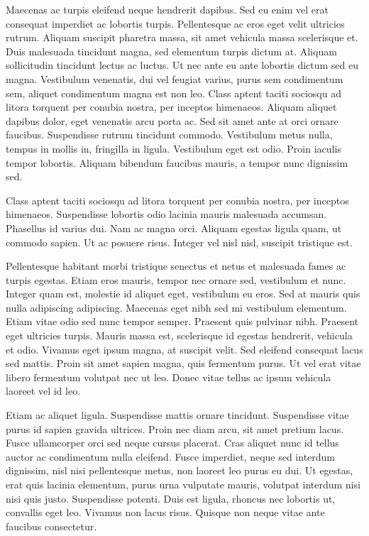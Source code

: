 \documentclass[a4paper]{article}
\begin{document}
Maecenas ac turpis eleifend neque hendrerit dapibus. Sed eu enim vel erat consequat imperdiet ac lobortis turpis. Pellentesque ac eros eget velit ultricies rutrum. Aliquam suscipit pharetra massa, sit amet vehicula massa scelerisque et. Duis malesuada tincidunt magna, sed elementum turpis dictum at. Aliquam sollicitudin tincidunt lectus ac luctus. Ut nec ante eu ante lobortis dictum sed eu magna. Vestibulum venenatis, dui vel feugiat varius, purus sem condimentum sem, aliquet condimentum magna est non leo. Class aptent taciti sociosqu ad litora torquent per conubia nostra, per inceptos himenaeos. Aliquam aliquet dapibus dolor, eget venenatis arcu porta ac. Sed sit amet ante at orci ornare faucibus. Suspendisse rutrum tincidunt commodo. Vestibulum metus nulla, tempus in mollis in, fringilla in ligula. Vestibulum eget est odio. Proin iaculis tempor lobortis. Aliquam bibendum faucibus mauris, a tempor nunc dignissim sed.

Class aptent taciti sociosqu ad litora torquent per conubia nostra, per inceptos himenaeos. Suspendisse lobortis odio lacinia mauris malesuada accumsan. Phasellus id varius dui. Nam ac magna orci. Aliquam egestas ligula quam, ut commodo sapien. Ut ac posuere risus. Integer vel nisl nisl, suscipit tristique est.

Pellentesque habitant morbi tristique senectus et netus et malesuada fames ac turpis egestas. Etiam eros mauris, tempor nec ornare sed, vestibulum et nunc. Integer quam est, molestie id aliquet eget, vestibulum eu eros. Sed at mauris quis nulla adipiscing adipiscing. Maecenas eget nibh sed mi vestibulum elementum. Etiam vitae odio sed nunc tempor semper. Praesent quis pulvinar nibh. Praesent eget ultricies turpis. Mauris massa est, scelerisque id egestas hendrerit, vehicula et odio. Vivamus eget ipsum magna, at suscipit velit. Sed eleifend consequat lacus sed mattis. Proin sit amet sapien magna, quis fermentum purus. Ut vel erat vitae libero fermentum volutpat nec ut leo. Donec vitae tellus ac ipsum vehicula laoreet vel id leo.

Etiam ac aliquet ligula. Suspendisse mattis ornare tincidunt. Suspendisse vitae purus id sapien gravida ultrices. Proin nec diam arcu, sit amet pretium lacus. Fusce ullamcorper orci sed neque cursus placerat. Cras aliquet nunc id tellus auctor ac condimentum nulla eleifend. Fusce imperdiet, neque sed interdum dignissim, nisl nisi pellentesque metus, non laoreet leo purus eu dui. Ut egestas, erat quis lacinia elementum, purus urna vulputate mauris, volutpat interdum nisi nisi quis justo. Suspendisse potenti. Duis est ligula, rhoncus nec lobortis ut, convallis eget leo. Vivamus non lacus risus. Quisque non neque vitae ante faucibus consectetur.
\end{document}
